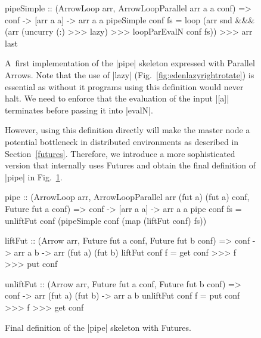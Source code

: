 \begin{figure}[t]
\begin{code}
pipeSimple :: (ArrowLoop arr, ArrowLoopParallel arr a a conf) =>
	conf -> [arr a a] -> arr a a
pipeSimple conf fs =
    loop (arr snd &&&
        (arr (uncurry (:) >>> lazy) >>> loopParEvalN conf fs)) >>>
    arr last
\end{code}
\caption{A~first implementation of the |pipe| skeleton expressed with Parallel Arrows. Note that the use of |lazy| (Fig.~\ref{fig:edenlazyrightrotate}) is essential as without it programs using this definition would never halt. We need to enforce that the evaluation of the input |[a]| terminates before passing it into |evalN|.}
\label{fig:pipeSimple}

However, using this definition directly will make the master node a potential bottleneck in distributed environments as described in Section~\ref{futures}. Therefore, we introduce a more sophisticated version that internally uses Futures and obtain the final definition of |pipe| in Fig.~\ref{fig:pipe}.

\begin{code}
pipe :: (ArrowLoop arr, ArrowLoopParallel arr (fut a) (fut a) conf,
	Future fut a conf) =>
	conf -> [arr a a] -> arr a a
pipe conf fs = unliftFut conf (pipeSimple conf (map (liftFut conf) fs))

liftFut :: (Arrow arr, Future fut a conf, Future fut b conf) =>
	conf -> arr a b -> arr (fut a) (fut b)
liftFut conf f = get conf >>> f >>> put conf

unliftFut :: (Arrow arr, Future fut a conf, Future fut b conf) =>
	conf -> arr (fut a) (fut b) -> arr a b
unliftFut conf f = put conf >>> f >>> get conf
\end{code}
\caption{Final definition of the |pipe| skeleton with Futures.}
\label{fig:pipe}
\end{figure}


